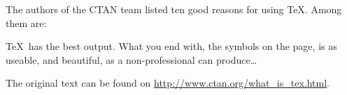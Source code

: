 \documentclass{article}
\begin{document}
The authors of the CTAN team listed ten good reasons
for using \TeX. Among them are:

\TeX\ has the best output. What you end with,
the symbols on the page, is as useable, and beautiful,
as a non-professional can produce\ldots

The original text can be found on
\url{ http://www.ctan.org/what_is_tex.html}.
\end{document}
